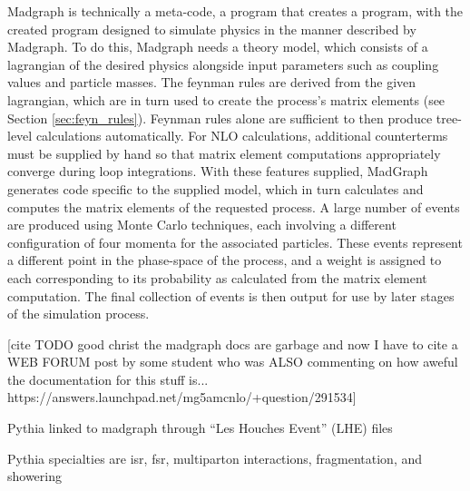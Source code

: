     Madgraph is technically a meta-code, a program that creates a program,
        with the created program designed to simulate physics in the manner described by Madgraph.
    To do this, Madgraph needs a theory model, which consists of a lagrangian of the desired physics
        alongside input parameters such as coupling values and particle masses.
    The feynman rules are derived from the given lagrangian,
        which are in turn used to create the process's matrix elements (see Section \ref{sec:feyn_rules}).
    Feynman rules alone are sufficient to then produce tree-level calculations automatically.
    For NLO calculations, additional counterterms must be supplied by hand
        so that matrix element computations appropriately converge during loop integrations. 
    With these features supplied, MadGraph generates code specific to the supplied model,
        which in turn calculates and computes the matrix elements of the requested process\cite{madgraph}.
    A large number of events are produced using Monte Carlo techniques,
        each involving a different configuration of four momenta for the associated particles.
    These events represent a different point in the phase-space of the process,
        and a weight is assigned to each corresponding to its probability as calculated from the matrix element computation.
    The final collection of events is then output for use by later stages of the simulation process.

    [cite TODO good christ the madgraph docs are garbage and now I have to cite a WEB FORUM post by some student who was ALSO commenting on how aweful the documentation for this stuff is... https://answers.launchpad.net/mg5amcnlo/+question/291534]

    Pythia linked to madgraph through ``Les Houches Event'' (LHE) files

    Pythia specialties are isr, fsr, multiparton interactions, fragmentation, and showering

    





